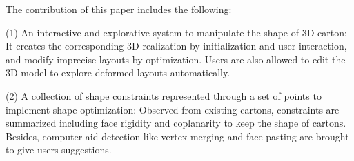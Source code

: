 The contribution of this paper includes the following:

(1) An interactive and explorative system to manipulate the shape of 3D carton: It creates the corresponding 3D realization by initialization and user interaction, and modify imprecise layouts by optimization. Users are also allowed to edit the 3D model to explore deformed layouts automatically.

(2) A collection of shape constraints represented through a set of points to implement shape optimization: Observed from existing cartons, constraints are summarized including face rigidity and coplanarity to keep the shape of cartons. Besides, computer-aid detection like vertex merging and face pasting are brought to give users suggestions. 